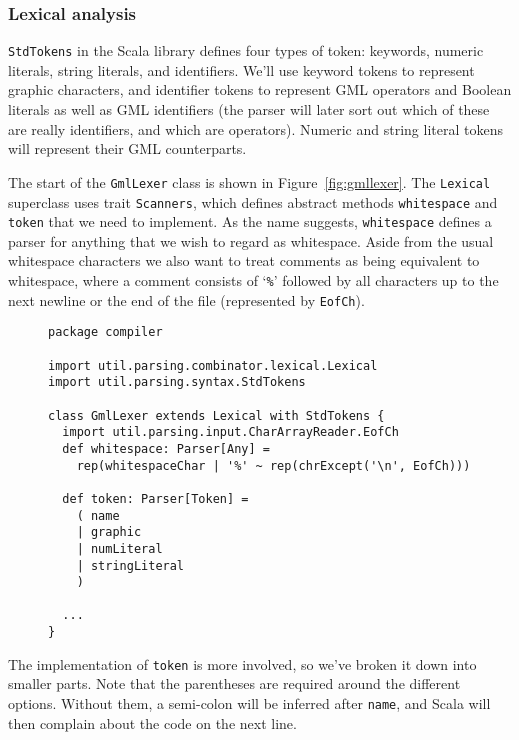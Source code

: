 \subsubsection{Lexical analysis\label{sec:lexer}}

\verb!StdTokens! in the Scala library defines four types of token:
keywords, numeric literals, string literals, and identifiers.
We'll use keyword tokens to represent graphic characters,
and identifier tokens to represent GML operators and Boolean literals
as well as GML identifiers (the parser will later sort out which of these
are really identifiers, and which are operators).
Numeric and string literal tokens will represent their GML counterparts.

The start of the \verb!GmlLexer! class is shown in Figure~\ref{fig:gmllexer}.
The \verb!Lexical! superclass uses trait \verb!Scanners!,
which defines abstract methods \verb!whitespace! and \verb!token!
that we need to implement.
As the name suggests, \verb!whitespace! defines a parser for
anything that we wish to regard as whitespace.
Aside from the usual whitespace characters
we also want to treat comments as being equivalent to whitespace,
where a comment consists of `\verb!%!' followed by all characters
up to the next newline or the end of the file
(represented by \verb!EofCh!).

\begin{figure}
\begin{verbatim}
package compiler

import util.parsing.combinator.lexical.Lexical
import util.parsing.syntax.StdTokens

class GmlLexer extends Lexical with StdTokens {
  import util.parsing.input.CharArrayReader.EofCh
  def whitespace: Parser[Any] =
    rep(whitespaceChar | '%' ~ rep(chrExcept('\n', EofCh)))

  def token: Parser[Token] =
    ( name
    | graphic
    | numLiteral
    | stringLiteral
    )

  ...
}
\end{verbatim}
\getcaption
\end{figure}

The implementation of \verb!token! is more involved,
so we've broken it down into smaller parts.
Note that the parentheses are required around the different options.
Without them, a semi-colon will be inferred after \verb!name!,
and Scala will then complain about the code on the next line.


